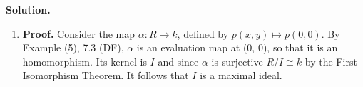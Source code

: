 \documentclass[9pt]{article}
\begin{document}
\begin{enumerate}
      \textbf{Solution.}
      
      \begin{enumerate}
         \item \textbf{Proof.} Consider the map $\alpha : R \rightarrow k$,
               defined by $p(x, y) \mapsto p(0, 0)$. By Example (5), 7.3 (DF),
               $\alpha$ is an evaluation map at (0, 0), so that it is an
               homomorphism. Its kernel is $I$ and since $\alpha$ is surjective
               $R/I \cong k$ by the First Isomorphism Theorem. It follows that
               $I$ is a maximal ideal.
      \end{enumerate}
\end{enumerate}
\end{document}

